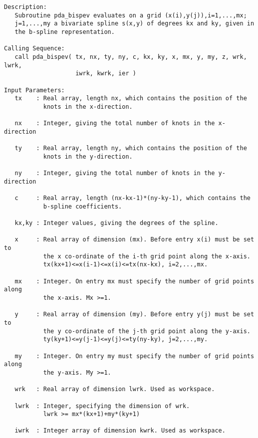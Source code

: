 

\begin{verbatim}
Description:
   Subroutine pda_bispev evaluates on a grid (x(i),y(j)),i=1,...,mx; 
   j=1,...,my a bivariate spline s(x,y) of degrees kx and ky, given in 
   the b-spline representation.

Calling Sequence:
   call pda_bispev( tx, nx, ty, ny, c, kx, ky, x, mx, y, my, z, wrk, lwrk, 
                    iwrk, kwrk, ier ) 

Input Parameters:
   tx    : Real array, length nx, which contains the position of the
           knots in the x-direction.

   nx    : Integer, giving the total number of knots in the x-direction

   ty    : Real array, length ny, which contains the position of the
           knots in the y-direction.

   ny    : Integer, giving the total number of knots in the y-direction

   c     : Real array, length (nx-kx-1)*(ny-ky-1), which contains the
           b-spline coefficients.

   kx,ky : Integer values, giving the degrees of the spline.

   x     : Real array of dimension (mx). Before entry x(i) must be set to 
           the x co-ordinate of the i-th grid point along the x-axis. 
           tx(kx+1)<=x(i-1)<=x(i)<=tx(nx-kx), i=2,...,mx.

   mx    : Integer. On entry mx must specify the number of grid points along
           the x-axis. Mx >=1.

   y     : Real array of dimension (my). Before entry y(j) must be set to 
           the y co-ordinate of the j-th grid point along the y-axis.
           ty(ky+1)<=y(j-1)<=y(j)<=ty(ny-ky), j=2,...,my.

   my    : Integer. On entry my must specify the number of grid points along
           the y-axis. My >=1.

   wrk   : Real array of dimension lwrk. Used as workspace.

   lwrk  : Integer, specifying the dimension of wrk. 
           lwrk >= mx*(kx+1)+my*(ky+1)

   iwrk  : Integer array of dimension kwrk. Used as workspace.


\end{verbatim}
